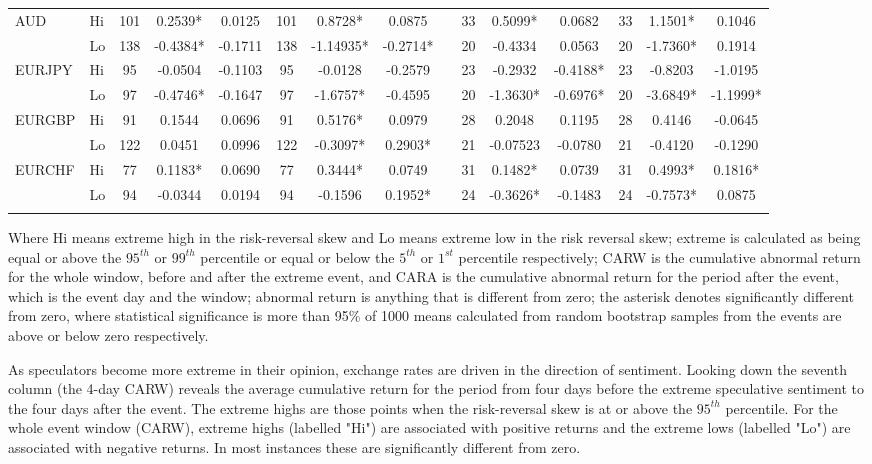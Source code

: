 \documentclass[ijfs,article,submit,oneauthor,pdftex,10pt,a4paper]{mdpi}
\begin{document}
\begin{sidewaystable}
\begin{threeparttable}
\begin{tabular}{llccccccccccccc}
\multirow{2}{*}{AUD}
& Hi & 101 &0.2539* &0.0125 &101 &0.8728* & 0.0875 &  &33 &0.5099* &0.0682 &33 & 1.1501*& 0.1046  \\ 
& Lo & 138 &-0.4384* & -0.1711 & 138 & -1.14935* & -0.2714* & &20 &-0.4334 & 0.0563 &20  & -1.7360* & 0.1914  \\
\multirow{2}{*}{EURJPY}
& Hi & 95 &-0.0504 &-0.1103 &95 &-0.0128 &-0.2579 & &23 &-0.2932 &-0.4188* &23 &-0.8203 & -1.0195  \\ 
& Lo & 97 &-0.4746* & -0.1647 &97 &-1.6757* &-0.4595 & &20 &-1.3630* & -0.6976* & 20 & -3.6849* &-1.1999*  \\
\multirow{2}{*}{EURGBP}
& Hi & 91 & 0.1544 &0.0696 &91 &0.5176* &0.0979 & &28 &0.2048 &0.1195 &28 & 0.4146 & -0.0645  \\ 
& Lo & 122 & 0.0451 & 0.0996 &122 &-0.3097* &0.2903* & & 21 &-0.07523 &-0.0780 &21 & -0.4120 &
-0.1290  \\
\multirow{2}{*}{EURCHF}
& Hi & 77 & 0.1183* & 0.0690 &77 & 0.3444* & 0.0749& & 	31 & 0.1482* &0.0739  &31 & 0.4993* 
& 0.1816*  \\ 
& Lo & 94 &-0.0344 & 0.0194 & 94 & -0.1596 &0.1952* & &24 & -0.3626* &-0.1483 & 24 & -0.7573* 
& 0.0875  \\
\hline
\label{tabref:RR1}
\end{tabular}
\begin{tablenotes}
\small 
\item Where Hi means extreme high in the risk-reversal skew and Lo means extreme low in the risk reversal skew; extreme is calculated as being equal or above the $95^{th}$ or $99^{th}$ percentile or equal or below the $5^{th}$ or $1^{st}$ percentile respectively; CARW is the cumulative abnormal return for the whole window, before and after the extreme event, and CARA is the cumulative abnormal return for the period after the event, which is the event day and the window; abnormal return is anything that is different from zero; the asterisk denotes significantly different from zero, where statistical significance is more than 95\% of 1000 means calculated from random bootstrap samples from the events are above or below zero respectively.   
\end{tablenotes}
\end{threeparttable}  
\end{sidewaystable}

As speculators become more extreme in their opinion, exchange rates are driven in the direction of sentiment. Looking down the seventh column (the 4-day CARW) reveals the average cumulative return for the period from four days before the extreme speculative sentiment to the four days after the event.   The extreme highs are those points when the risk-reversal skew is at or above the $95^{th}$ percentile.  For the whole event window (CARW), extreme highs (labelled "Hi") are associated with positive returns and the extreme lows (labelled "Lo") are associated with negative returns. In most instances these are significantly different from zero.  
\end{document}
